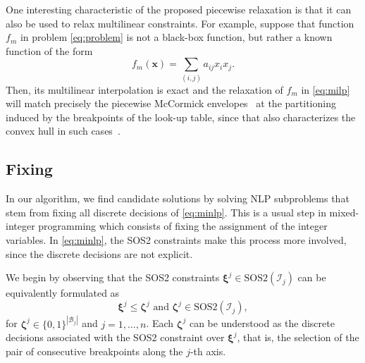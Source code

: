 \documentclass[pdflatex,sn-mathphys-num]{sn-jnl}%
\newcommand{\new}[1]{#1}
\begin{document}
One interesting characteristic of the proposed piecewise relaxation is that it can also be used to relax multilinear constraints.
For example, suppose that function $f_m$ in problem \eqref{eq:problem} is not a black-box function, but rather a known function of the form
\begin{equation}
    f_m(\bm{x}) = \sum_{(i,j)} a_{ij}x_i x_j
.\end{equation}
\new{Then, its multilinear interpolation is exact and} the relaxation of $f_m$ in \ref{eq:milp} will match precisely the piecewise McCormick envelopes~\citep{CASTRO2015300} at the partitioning induced by the breakpoints of the look-up table, since that also characterizes the convex hull in such cases~\citep{al-khayyalJointlyConstrainedBiconvex1983}.


\subsection{Fixing}\label{sec:fixing}

\new{%
In our algorithm, we find candidate solutions by solving NLP subproblems that stem from fixing all discrete decisions of \ref{eq:minlp}.
This is a usual step in mixed-integer programming which consists of fixing the assignment of the integer variables.
In \ref{eq:minlp}, the SOS2 constraints make this process more involved, since the discrete decisions are not explicit.
}

\new{%
We begin by observing that the SOS2 constraints $\bm{\xi}^j\in \text{SOS2}(\mathcal{I}_j)$ can be equivalently formulated as
\begin{equation}\label{eq:sos2-binaries}
    \bm{\xi}^j \le \bm{\zeta}^{j} \text{ and }  \bm{\zeta}^{j}\in \text{SOS2}(\mathcal{I}_j)
,\end{equation}
for $\bm{\zeta}^{j} \in \{0,1\}^{|\mathcal{B}_j|}$ and $j=1,\ldots,n$.
Each $\bm{\zeta}^{j}$ can be understood as the discrete decisions associated with the SOS2 constraint over $\bm{\xi}^j$, that is, the selection of the pair of consecutive breakpoints along the $j$-th axis.
}
\end{document}
